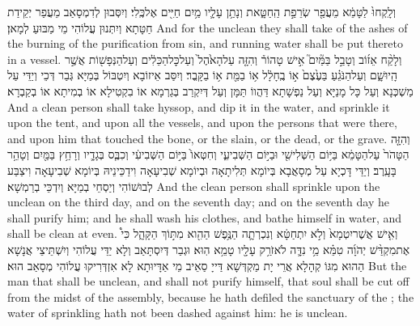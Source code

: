 {וְלָֽקְחוּ֙ לַטָּמֵ֔א מֵעֲפַ֖ר שְׂרֵפַ֣ת הַֽחַטָּ֑את וְנָתַ֥ן עָלָ֛יו מַ֥יִם חַיִּ֖ים אֶל\maqqaf כֶּֽלִי׃}
{וְיִסְּבוּן לְדִמְסָאַב מֵעֲפַר יְקֵידַת חַטָּתָא וְיִתְּנוּן עֲלוֹהִי מֵי מַבּוּעַ לְמָאן׃}
{And for the unclean they shall take of the ashes of the burning of the purification from sin, and running water shall be put thereto in a vessel.}{}
{וְלָקַ֨ח אֵז֜וֹב וְטָבַ֣ל בַּמַּ֘יִם֮ אִ֣ישׁ טָהוֹר֒ וְהִזָּ֤ה עַל\maqqaf הָאֹ֙הֶל֙ וְעַל\maqqaf כׇּל\maqqaf הַכֵּלִ֔ים וְעַל\maqqaf הַנְּפָשׁ֖וֹת אֲשֶׁ֣ר הָֽיוּ\maqqaf שָׁ֑ם וְעַל\maqqaf הַנֹּגֵ֗עַ בַּעֶ֙צֶם֙ א֣וֹ בֶֽחָלָ֔ל א֥וֹ בַמֵּ֖ת א֥וֹ בַקָּֽבֶר׃}
{וְיִסַּב אֵיזוֹבָא וְיִטְבּוֹל בְּמַיָּא גְּבַר דְּכֵי וְיַדֵּי עַל מַשְׁכְּנָא וְעַל כָּל מָנַיָּא וְעַל נַפְשָׁתָא דַּהֲווֹ תַּמָּן וְעַל דְּיִקְרַב בְּגַרְמָא אוֹ בִקְטִילָא אוֹ בְמִיתָא אוֹ בְקַבְרָא׃}
{And a clean person shall take hyssop, and dip it in the water, and sprinkle it upon the tent, and upon all the vessels, and upon the persons that were there, and upon him that touched the bone, or the slain, or the dead, or the grave.}{}
{וְהִזָּ֤ה הַטָּהֹר֙ עַל\maqqaf הַטָּמֵ֔א בַּיּ֥וֹם הַשְּׁלִישִׁ֖י וּבַיּ֣וֹם הַשְּׁבִיעִ֑י וְחִטְּאוֹ֙ בַּיּ֣וֹם הַשְּׁבִיעִ֔י וְכִבֶּ֧ס בְּגָדָ֛יו וְרָחַ֥ץ בַּמַּ֖יִם וְטָהֵ֥ר בָּעָֽרֶב׃}
{וְיַדֵּי דָּכְיָא עַל מְסָאֲבָא בְּיוֹמָא תְּלִיתָאָה וּבְיוֹמָא שְׁבִיעָאָה וִידַכֵּינֵיהּ בְּיוֹמָא שְׁבִיעָאָה וִיצַבַּע לְבוּשׁוֹהִי וְיַסְחֵי בְמַיָּא וְיִדְכֵּי בְרַמְשָׁא׃}
{And the clean person shall sprinkle upon the unclean on the third day, and on the seventh day; and on the seventh day he shall purify him; and he shall wash his clothes, and bathe himself in water, and shall be clean at even.}{}
{וְאִ֤ישׁ אֲשֶׁר\maqqaf יִטְמָא֙ וְלֹ֣א יִתְחַטָּ֔א וְנִכְרְתָ֛ה הַנֶּ֥פֶשׁ הַהִ֖וא מִתּ֣וֹךְ הַקָּהָ֑ל כִּי֩ אֶת\maqqaf מִקְדַּ֨שׁ יְהֹוָ֜ה טִמֵּ֗א מֵ֥י נִדָּ֛ה לֹא\maqqaf זֹרַ֥ק עָלָ֖יו טָמֵ֥א הֽוּא׃}
{וּגְבַר דְּיִסְתָּאַב וְלָא יַדֵּי עֲלוֹהִי וְיִשְׁתֵּיצֵי אֲנָשָׁא הַהוּא מִגּוֹ קְהָלָא אֲרֵי יָת מַקְדְּשָׁא דַּייָ סַאֵיב מֵי אַדָּיוּתָא לָא אִזְדְּרִיקוּ עֲלוֹהִי מְסָאַב הוּא׃}
{But the man that shall be unclean, and shall not purify himself, that soul shall be cut off from the midst of the assembly, because he hath defiled the sanctuary of the \lord; the water of sprinkling hath not been dashed against him: he is unclean.}{}
